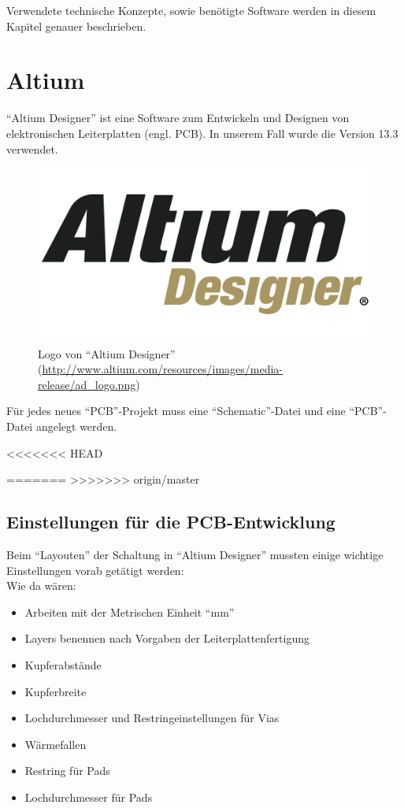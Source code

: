 Verwendete technische Konzepte, sowie benötigte Software werden in diesem Kapitel genauer beschrieben.

\section{Altium}\label{sec:3.1}
\enquote{Altium Designer} ist eine Software zum Entwickeln und Designen von elektronischen Leiterplatten (engl. PCB). In unserem Fall wurde die Version 13.3 verwendet. 
\begin{figure} [H]
	\centering
	\includegraphics[width=1\textwidth]{img/Grundlagen/Altium/ad_logo.png}
	\caption{Logo von \enquote{Altium Designer} (\url{http://www.altium.com/resources/images/media-release/ad_logo.png})}
	\label{fig:3.1.1}
\end{figure}

Für jedes neues \enquote{PCB}-Projekt muss eine \enquote{Schematic}-Datei und eine \enquote{PCB}-Datei angelegt werden.


<<<<<<< HEAD

=======
>>>>>>> origin/master
\subsection{Einstellungen für die PCB-Entwicklung}\label{subsec:3.1.1}
Beim \enquote{Layouten} der Schaltung in \enquote{Altium Designer} mussten einige wichtige Einstellungen vorab getätigt werden:\\
Wie da wären:
\begin{itemize}
	\item Arbeiten mit der Metrischen Einheit \enquote{mm}
	\item Layers benennen nach Vorgaben der Leiterplattenfertigung
	\item Kupferabstände
	\item Kupferbreite
	\item Lochdurchmesser und Restringeinstellungen für Vias
	\item Wärmefallen
	\item Restring für Pads
	\item Lochdurchmesser für Pads
\end{itemize}

